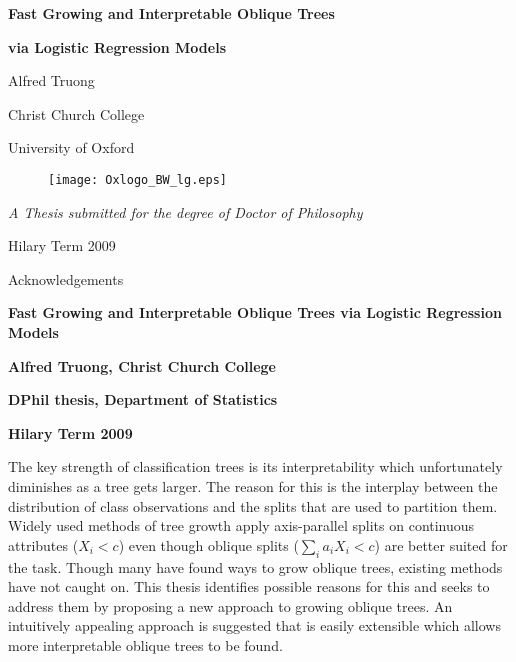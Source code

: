 \documentclass[12pt]{report}
\begin{document}
\begin{titlepage}

\LARGE \centerline{\bf Fast Growing and Interpretable Oblique Trees \rm }
\LARGE \centerline{\bf via Logistic Regression Models \rm }
\vspace{3em}
\large \centerline{Alfred Truong}
\vspace{0.5em}
\large \centerline{Christ Church College}
\vspace{0.5em}
\large \centerline{University of Oxford}
\vspace{2em}
\begin{figure} [h!]
\begin{center}
\texttt{[image: Oxlogo\_BW\_lg.eps]}
\end{center}
\end{figure}
\vspace{2em}
\large \centerline{\emph{A Thesis submitted for the degree of Doctor of Philosophy}}
\vspace{3em}
\large \centerline{Hilary Term 2009}

\end{titlepage}

\pagebreak
\thispagestyle{empty}

\vspace*{17cm}

Acknowledgements

\pagebreak
\thispagestyle{empty}

\begin{center}
\large \bf Fast Growing and Interpretable Oblique Trees via Logistic Regression Models
\end{center}
\vspace*{0.5cm}
\centerline{\bf Alfred Truong, Christ Church College}
\vspace*{0.5cm}
\centerline{\bf DPhil thesis, Department of Statistics}
\vspace*{0.5cm}
\centerline{\bf Hilary Term 2009}
\vspace*{0.5cm}

The key strength of classification trees is its interpretability which unfortunately diminishes as a tree gets larger. The reason for this is the interplay between the distribution of class observations and the splits that are used to partition them. Widely used methods of tree growth apply axis-parallel splits on continuous attributes ($X_i<c$) even though oblique splits ($\sum_i a_iX_i<c$) are better suited for the task. Though many have found ways to grow oblique trees, existing methods have not caught on. This thesis identifies possible reasons for this and seeks to address them by proposing a new approach to growing oblique trees. An intuitively appealing approach is suggested that is easily extensible which allows more interpretable oblique trees to be found. 
\end{document}
